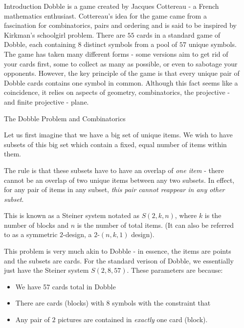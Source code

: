 \documentclass[final]{beamer}
\newlength{\sepwidth}
\newlength{\colwidth}
\newcommand{\separatorcolumn}{\begin{column}{\sepwidth}\end{column}}
\begin{document}
\begin{frame}[t]
\begin{columns}[t]
\separatorcolumn

\begin{column}{\colwidth}

  \begin{block}{Introduction}
    Dobble is a game created by Jacques Cottereau - a French mathematics enthusiast. Cottereau’s idea for the game came from a fascination for combinatorics, pairs and ordering and is said to be inspired by Kirkman’s schoolgirl problem. There are $55$ cards in a standard game of Dobble, each containing $8$ distinct symbols from a pool of $57$ unique symbols. The game has taken many different forms - some versions aim to get rid of your cards first, some to collect as many as possible, or even to sabotage your opponents. However, the key principle of the game is that every unique pair of Dobble cards contains one symbol in common. Although this fact seems like a coincidence, it relies on aspects of geometry, combinatorics, the projective - and finite projective - plane. 
  \end{block}

  \begin{alertblock}{The Dobble Problem and Combinatorics}

    Let us first imagine that we have a big set of unique items. We wish to have subsets of this big set which contain a fixed, equal number of items within them.
    
    The rule is that these subsets have to have an overlap of \emph{one item} - there cannot be an overlap of two unique items between any two subsets. In effect, for any pair of items in any subset, \emph{this pair cannot reappear in any other subset}.

    This is known as a Steiner system notated as $S(2,k,n)$, where $k$ is the number of blocks and $n$ is the number of total items. (It can also be referred to as a symmetric $2$-design, a $2$-$(n,k,1)$ design).

This problem is very much akin to Dobble - in essence, the items are points and the subsets are cards. For the standard verison of Dobble, we essentially just have the Steiner system $S(2,8,57)$.
These parameters are because:
\begin{itemize}
    \item We have 57 cards total in Dobble
    \item There are cards (blocks) with $8$ symbols with the constraint that
    \item Any pair of $2$ pictures are contained in \emph{exactly} one card (block).
\end{itemize}


\end{alertblock}
\end{column}
\end{columns}
\end{frame}
\end{document}
